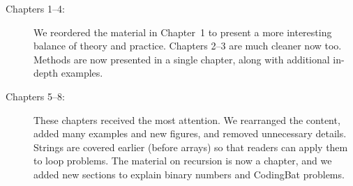 \begin{description}

\item[Chapters 1--4:]

We reordered the material in Chapter~1 to present a more interesting balance of theory and practice.
Chapters 2--3 are much cleaner now too.
Methods are now presented in a single chapter, along with additional in-depth examples.

\item[Chapters 5--8:]

These chapters received the most attention.
We rearranged the content, added many examples and new figures, and removed unnecessary details.
Strings are covered earlier (before arrays) so that readers can apply them to loop problems.
The material on recursion is now a chapter, and we added new sections to explain binary numbers and CodingBat problems.

\end{description}
